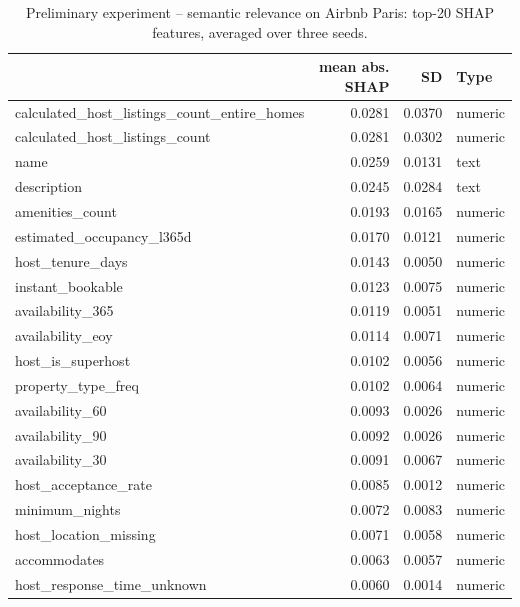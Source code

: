 \begin{table}
\centering
\caption{Preliminary experiment -- semantic relevance on Airbnb Paris: top-20 SHAP features, averaged over three seeds.}
\label{tab:preliminary_airbnb_paris}
\begin{tabular}{lrrl}
\toprule
 & \bfseries mean abs. SHAP & \bfseries SD & \bfseries Type \\
\midrule
calculated\_host\_listings\_count\_entire\_homes & 0.0281 & 0.0370 & numeric \\
calculated\_host\_listings\_count & 0.0281 & 0.0302 & numeric \\
name & 0.0259 & 0.0131 & text \\
description & 0.0245 & 0.0284 & text \\
amenities\_count & 0.0193 & 0.0165 & numeric \\
estimated\_occupancy\_l365d & 0.0170 & 0.0121 & numeric \\
host\_tenure\_days & 0.0143 & 0.0050 & numeric \\
instant\_bookable & 0.0123 & 0.0075 & numeric \\
availability\_365 & 0.0119 & 0.0051 & numeric \\
availability\_eoy & 0.0114 & 0.0071 & numeric \\
host\_is\_superhost & 0.0102 & 0.0056 & numeric \\
property\_type\_freq & 0.0102 & 0.0064 & numeric \\
availability\_60 & 0.0093 & 0.0026 & numeric \\
availability\_90 & 0.0092 & 0.0026 & numeric \\
availability\_30 & 0.0091 & 0.0067 & numeric \\
host\_acceptance\_rate & 0.0085 & 0.0012 & numeric \\
minimum\_nights & 0.0072 & 0.0083 & numeric \\
host\_location\_missing & 0.0071 & 0.0058 & numeric \\
accommodates & 0.0063 & 0.0057 & numeric \\
host\_response\_time\_unknown & 0.0060 & 0.0014 & numeric \\
\bottomrule
\end{tabular}
\end{table}
